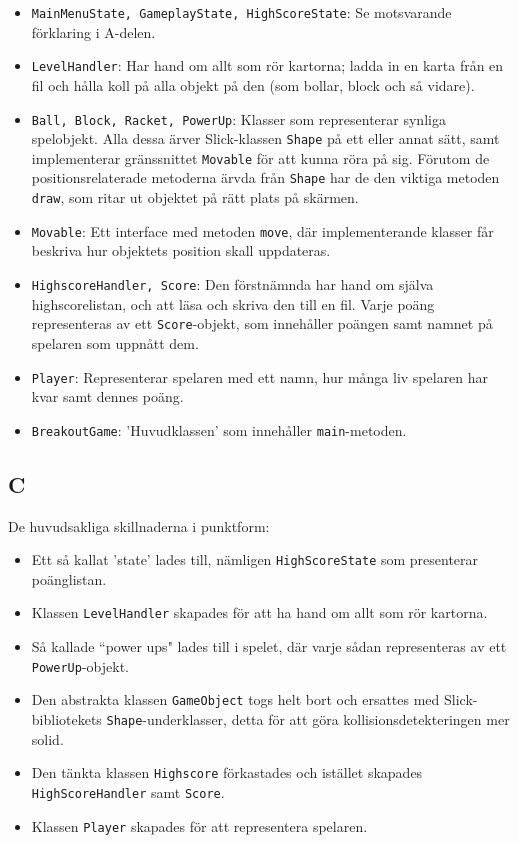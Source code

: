 \documentclass[11pt,a4paper]{article}
\begin{document}
\begin{itemize}
	\item \texttt{MainMenuState, GameplayState, HighScoreState}: Se motsvarande förklaring i A-delen.
	\item \texttt{LevelHandler}: Har hand om allt som rör kartorna; ladda in en karta från en fil och hålla koll på alla objekt på den (som bollar, block och så vidare).
	\item \texttt{Ball, Block, Racket, PowerUp}: Klasser som representerar synliga spelobjekt. Alla dessa ärver Slick-klassen \texttt{Shape} på ett eller annat sätt, samt implementerar gränssnittet \texttt{Movable} för att kunna röra på sig. Förutom de positionsrelaterade metoderna ärvda från \texttt{Shape} har de den viktiga metoden \texttt{draw}, som ritar ut objektet på rätt plats på skärmen.
	\item \texttt{Movable}: Ett interface med metoden \texttt{move}, där implementerande klasser får beskriva hur objektets position skall uppdateras.
	\item \texttt{HighscoreHandler, Score}: Den förstnämnda har hand om själva highscorelistan, och att läsa och skriva den till en fil. Varje poäng representeras av ett \texttt{Score}-objekt, som innehåller poängen samt namnet på spelaren som uppnått dem.
	\item \texttt{Player}: Representerar spelaren med ett namn, hur många liv spelaren har kvar samt dennes poäng.
	\item \texttt{BreakoutGame}: 'Huvudklassen' som innehåller \texttt{main}-metoden.
\end{itemize}

\subsection{C}
De huvudsakliga skillnaderna i punktform:

\begin{itemize}
	\item Ett så kallat 'state' lades till, nämligen \texttt{HighScoreState} som presenterar poänglistan.
	\item Klassen \texttt{LevelHandler} skapades för att ha hand om allt som rör kartorna.
	\item Så kallade ``power ups" lades till i spelet, där varje sådan representeras av ett \texttt{PowerUp}-objekt.
	\item Den abstrakta klassen \texttt{GameObject} togs helt bort och ersattes med Slick-bibliotekets \texttt{Shape}-underklasser, detta för att göra kollisionsdetekteringen mer solid.
	\item Den tänkta klassen \texttt{Highscore} förkastades och istället skapades \texttt{HighScoreHandler} samt \texttt{Score}.
	\item Klassen \texttt{Player} skapades för att representera spelaren.
\end{itemize}
\end{document}
